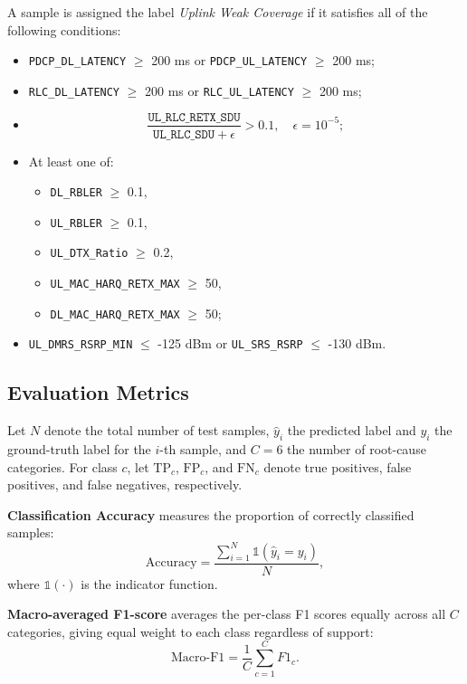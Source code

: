 \documentclass[lettersize,journal]{IEEEtran}
\begin{document}
{{A sample is assigned the label \textit{Uplink Weak Coverage} if it satisfies all of the following conditions:
\begin{itemize}
\item[(1)] \texttt{PDCP\_DL\_LATENCY} $\ge$ 200 ms or \texttt{PDCP\_UL\_LATENCY} $\ge$ 200 ms;
\item[(2)] \texttt{RLC\_DL\_LATENCY} $\ge$ 200 ms or \texttt{RLC\_UL\_LATENCY} $\ge$ 200 ms;
\item[(3)] 
\[
\frac{\texttt{UL\_RLC\_RETX\_SDU}}{\texttt{UL\_RLC\_SDU} + \epsilon} > 0.1, \quad \epsilon = 10^{-5};
\]
\item[(4)] At least one of:
\begin{itemize}
  \item[] \texttt{DL\_RBLER} $\ge$ 0.1,
  \item[] \texttt{UL\_RBLER} $\ge$ 0.1,
  \item[] \texttt{UL\_DTX\_Ratio} $\ge$ 0.2,
  \item[] \texttt{UL\_MAC\_HARQ\_RETX\_MAX} $\ge$ 50, 
  \item[] \texttt{DL\_MAC\_HARQ\_RETX\_MAX} $\ge$ 50;
\end{itemize}
\item[(5)] \texttt{UL\_DMRS\_RSRP\_MIN} $\le$ -125 dBm or \texttt{UL\_SRS\_RSRP} $\le$ -130 dBm.
\end{itemize}


\subsection{Evaluation Metrics}
\label{appendix:metrics}

Let $N$ denote the total number of test samples, $\hat{y}_i$ the predicted label and $y_i$ the ground-truth label for the $i$-th sample, and $C = 6$ the number of root-cause categories. For class $c$, let $\mathrm{TP}_c$, $\mathrm{FP}_c$, and $\mathrm{FN}_c$ denote true positives, false positives, and false negatives, respectively.

\noindent\textbf{Classification Accuracy} measures the proportion of correctly classified samples:
\begin{equation}
\text{Accuracy} = \frac{\sum_{i=1}^{N} \mathbb{1}(\hat{y}_i = y_i)}{N},
\end{equation}
where $\mathbb{1}(\cdot)$ is the indicator function.

\noindent\textbf{Macro-averaged F1-score} averages the per-class F1 scores equally across all $C$ categories, giving equal weight to each class regardless of support:
\begin{equation}
\text{Macro-F1} = \frac{1}{C}\sum_{c=1}^{C} F1_c.
\end{equation}

}}
\end{document}
